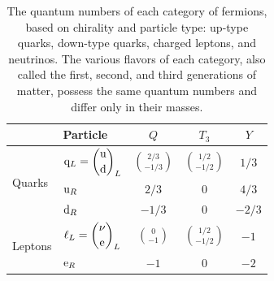 \begin{table}[htb]
  \begin{center}
    \def\arraystretch{2.0} %
    \begin{tabular}{|l||l|c|c|c|}
\hline
      & Particle & $Q$ & $T_3$ & $Y$ \\
\hline
\hline
\multirow{3}{*}{Quarks}  & $\mathrm{q}_L = \displaystyle\binom{\mathrm{u}}{\mathrm{d}}_L$ & $\displaystyle\binom{2/3}{-1/3}$ & $\displaystyle\binom{1/2}{-1/2}$ & $1/3$  \\
                         & $\mathrm{u}_R$                                      & $2/3$                            & 0                                & $4/3$  \\
                         & $\mathrm{d}_R$                                      & $-1/3$                           & 0                                & $-2/3$ \\
\hline
\multirow{3}{*}{Leptons} & $\ell_L = \displaystyle\binom{\nu}{\mathrm{e}}_L$     & $\displaystyle\binom{0}{-1}$     & $\displaystyle\binom{1/2}{-1/2}$ & $-1$   \\
                         & $\mathrm{e}_R$                                        & $-1$                             & 0                                & $-2$   \\
\hline
    \end{tabular}
    \caption{The quantum numbers of each category of fermions, based on chirality and particle type: up-type quarks, down-type quarks, charged leptons, and neutrinos. The various flavors of each category, also called the first, second, and third generations of matter, possess the same quantum numbers and differ only in their masses.}
    \label{tab:q-num}
  \end{center}
\end{table}

